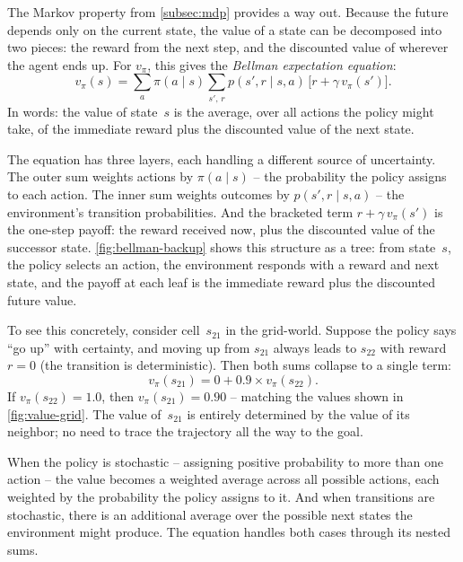 \smallskip
The Markov property from \cref{subsec:mdp} provides a way out.
Because the future depends only on the current state, the value of a
state can be decomposed into two pieces: the reward from the next
step, and the discounted value of wherever the agent ends up. For
$v_\pi$, this gives the \emph{Bellman expectation equation}:
%
\begin{equation}
\label{eq:bellman-expectation}
v_\pi(s) = \sum_{a} \pi(a \mid s) \sum_{s',\, r}
  p(s', r \mid s, a)\,\big[r + \gamma\, v_\pi(s')\big].
\end{equation}
%
In words: the value of state~$s$ is the average, over all actions the
policy might take, of the immediate reward plus the discounted value
of the next state.

\smallskip
The equation has three layers, each handling a different source of
uncertainty. The outer sum weights actions by $\pi(a \mid s)$ -- the
probability the policy assigns to each action. The inner sum weights
outcomes by $p(s', r \mid s, a)$ -- the environment's transition
probabilities. And the bracketed term $r + \gamma\, v_\pi(s')$ is the
one-step payoff: the reward received now, plus the discounted value of
the successor state. \cref{fig:bellman-backup} shows this structure
as a tree: from state~$s$, the policy selects an action, the
environment responds with a reward and next state, and the payoff at
each leaf is the immediate reward plus the discounted future value.



\smallskip
To see this concretely, consider cell~$s_{21}$ in the grid-world.
Suppose the policy says ``go up'' with certainty, and moving up from
$s_{21}$ always leads to $s_{22}$ with reward $r = 0$ (the transition
is deterministic). Then both sums collapse to a single term:
%
\[
v_\pi(s_{21}) = 0 + 0.9 \times v_\pi(s_{22}).
\]
%
If $v_\pi(s_{22}) = 1.0$, then $v_\pi(s_{21}) = 0.90$ -- matching
the values shown in \cref{fig:value-grid}. The value of~$s_{21}$ is
entirely determined by the value of its neighbor; no need to trace the
trajectory all the way to the goal.

\smallskip
When the policy is stochastic -- assigning positive probability to
more than one action -- the value becomes a weighted average across
all possible actions, each weighted by the probability the policy
assigns to it. And when transitions are stochastic, there is an
additional average over the possible next states the environment might
produce. The equation handles both cases through its nested sums.

